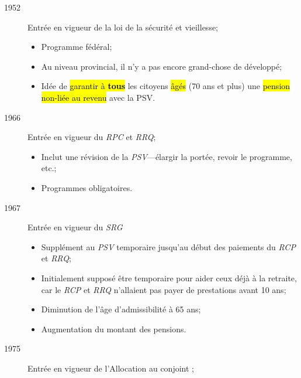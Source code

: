 \documentclass[10pt, french]{article}
\begin{document}
\begin{multicols*}{3}
\begin{rappel_enhanced}[Historique]
\begin{description}
	\item[1952]	Entrée en vigueur de la loi de la sécurité et vieillesse;
		\begin{itemize}[leftmargin = *]
		\item	Programme \textcolor{bulgarianrose}{fédéral};
		\item	Au niveau \textcolor{blue(pigment)}{provincial}, il n'y a pas encore grand-chose de développé;
		\item	Idée de \hl{garantir à \textbf{tous}} les citoyens \hl{âgés} (70 ans et plus) une \hl{pension non-liée au revenu} avec la PSV.
		\end{itemize}
	\item[1966]	Entrée en vigueur du \textit{RPC} et \textit{RRQ};
		\begin{itemize}[leftmargin = *]
		\item	Inclut une révision de la \textit{PSV}---élargir la portée, revoir le programme, etc.;
		\item	Programmes obligatoires.	
		\end{itemize}
	\item[1967]	Entrée en vigueur du \textit{SRG}
		\begin{itemize}[leftmargin = *]
		\item	Supplément au \textit{PSV} temporaire jusqu'au début des paiements du \textit{RCP} et \textit{RRQ};
		\item	Initialement supposé être temporaire pour aider ceux déjà à la retraite, car le \textit{RCP} et \textit{RRQ} n'allaient pas payer de prestations avant 10 ans;
		\item	Diminution de l'âge d'admissibilité à 65 ans;
		\item	Augmentation du montant des pensions.
		\end{itemize}
	\item[1975]	Entrée en vigueur de l'Allocation au conjoint ;

\end{description}
\end{rappel_enhanced}
\end{multicols*}
\end{document}

